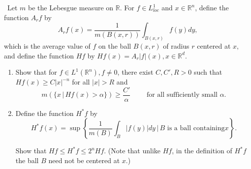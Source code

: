 \documentclass[12pt]{Homework}
\begin{document}
\begin{problem} $\,$
Let $m$ be the Lebesgue measure on $\mathbb{R}$. For $f\in L_{loc}^1$ and $x\in\mathbb{R}^n$, define the function $A_rf$ by $$A_rf(x)=\frac{1}{m(B(x,r))}\int_{B(x,r)}f(y)dy,$$ which is the average value of $f$ on the ball $B(x,r)$ of radius $r$ centered at $x,$ and define the function $Hf$ by $Hf(x)=A_r|f|(x),x\in\mathbb{R}^d.$
\begin{enumerate}[label=(\alph*)]
    \item Show that for $f\in L^1(\mathbb{R}^n),f\not=0$, there exist $C,C',R>0$ such that $Hf(x)\ge C|x|^{-n}$ for all $|x|>R$ and $$m\left(\{x\,|\,Hf(x)>\alpha\}\right)\ge\frac{C'}{\alpha}\qquad\text{ for all sufficiently small }\alpha.$$
    \item Define the function $H^*f$ by $$H^*f(x)=\sup\left\{\frac{1}{m(B)}\int_B|f(y)|dy\,\bigg|\, B\text{ is a ball containing}x\right\}.$$

Show that $Hf\le H^*f\le 2^nHf$. (Note that unlike $Hf$, in the definition of $H^*f$ the ball $B$ need not be centered at $x$.)
\end{enumerate}
\end{problem}
\end{document}
